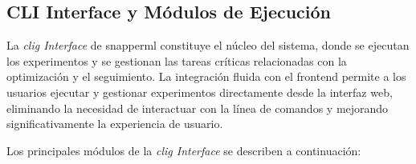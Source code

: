 \subsection{CLI Interface y Módulos de Ejecución}

La \textit{\Gls{clig} Interface} de \Gls{snapperml} constituye el núcleo del sistema, donde se ejecutan los experimentos y se gestionan las tareas críticas relacionadas con la optimización y el seguimiento. La integración fluida con el \gls{frontend} permite a los usuarios ejecutar y gestionar experimentos directamente desde la interfaz web, eliminando la necesidad de interactuar con la línea de comandos y mejorando significativamente la experiencia de usuario.

Los principales módulos de la \textit{\Gls{clig} Interface} se describen a continuación:

